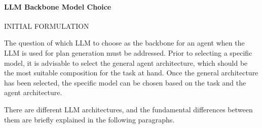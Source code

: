 \documentclass{article}
\begin{document}
\paragraph{LLM Backbone Model Choice}
\label{LLMBackboneModel}
INITIAL FORMULATION

%

The question of which LLM to choose as the backbone for an agent when the LLM is used for plan generation must be addressed. Prior to selecting a specific model, it is advisable to select the general agent architecture, which should be the most suitable composition for the task at hand. Once the general architecture has been selected, the specific model can be chosen based on the task and the agent architecture.

There are different LLM architectures, and the fundamental differences between them are briefly explained in the following paragraphs.
\end{document}
